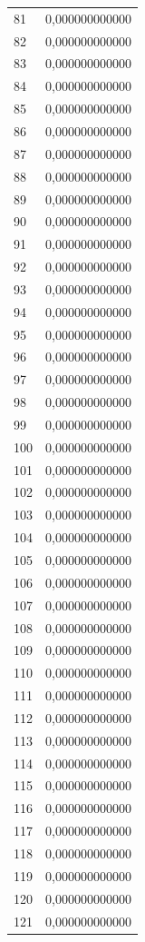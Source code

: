 \begin{tabular}{lr}
81 & 0,000000000000 \\
82 & 0,000000000000 \\
83 & 0,000000000000 \\
84 & 0,000000000000 \\
85 & 0,000000000000 \\
86 & 0,000000000000 \\
87 & 0,000000000000 \\
88 & 0,000000000000 \\
89 & 0,000000000000 \\
90 & 0,000000000000 \\
91 & 0,000000000000 \\
92 & 0,000000000000 \\
93 & 0,000000000000 \\
94 & 0,000000000000 \\
95 & 0,000000000000 \\
96 & 0,000000000000 \\
97 & 0,000000000000 \\
98 & 0,000000000000 \\
99 & 0,000000000000 \\
100 & 0,000000000000 \\
101 & 0,000000000000 \\
102 & 0,000000000000 \\
103 & 0,000000000000 \\
104 & 0,000000000000 \\
105 & 0,000000000000 \\
106 & 0,000000000000 \\
107 & 0,000000000000 \\
108 & 0,000000000000 \\
109 & 0,000000000000 \\
110 & 0,000000000000 \\
111 & 0,000000000000 \\
112 & 0,000000000000 \\
113 & 0,000000000000 \\
114 & 0,000000000000 \\
115 & 0,000000000000 \\
116 & 0,000000000000 \\
117 & 0,000000000000 \\
118 & 0,000000000000 \\
119 & 0,000000000000 \\
120 & 0,000000000000 \\
121 & 0,000000000000 \\

\end{tabular}
